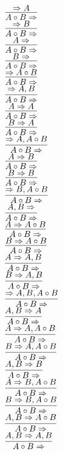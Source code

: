 \documentclass[11pt]{article}
\begin{document}
\begin{center}
\bigskip
\\$\infer{A\circ B\Rightarrow }{\Rightarrow A}$
\bigskip
\\$\infer{A\circ B\Rightarrow }{\Rightarrow B}$
\bigskip
\\$\infer{A\circ B\Rightarrow }{A\Rightarrow }$
\bigskip
\\$\infer{A\circ B\Rightarrow }{B\Rightarrow }$
\bigskip
\\$\infer{A\circ B\Rightarrow }{\Rightarrow A\circ B}$
\bigskip
\\$\infer{A\circ B\Rightarrow }{\Rightarrow A, B}$
\bigskip
\\$\infer{A\circ B\Rightarrow }{A\Rightarrow A}$
\bigskip
\\$\infer{A\circ B\Rightarrow }{B\Rightarrow A}$
\bigskip
\\$\infer{A\circ B\Rightarrow }{\Rightarrow A, A\circ B}$
\bigskip
\\$\infer{A\circ B\Rightarrow }{A\Rightarrow B}$
\bigskip
\\$\infer{A\circ B\Rightarrow }{B\Rightarrow B}$
\bigskip
\\$\infer{A\circ B\Rightarrow }{\Rightarrow B, A\circ B}$
\bigskip
\\$\infer{A\circ B\Rightarrow }{A, B\Rightarrow }$
\bigskip
\\$\infer{A\circ B\Rightarrow }{A\Rightarrow A\circ B}$
\bigskip
\\$\infer{A\circ B\Rightarrow }{B\Rightarrow A\circ B}$
\bigskip
\\$\infer{A\circ B\Rightarrow }{A\Rightarrow A, B}$
\bigskip
\\$\infer{A\circ B\Rightarrow }{B\Rightarrow A, B}$
\bigskip
\\$\infer{A\circ B\Rightarrow }{\Rightarrow A, B, A\circ B}$
\bigskip
\\$\infer{A\circ B\Rightarrow }{A, B\Rightarrow A}$
\bigskip
\\$\infer{A\circ B\Rightarrow }{A\Rightarrow A, A\circ B}$
\bigskip
\\$\infer{A\circ B\Rightarrow }{B\Rightarrow A, A\circ B}$
\bigskip
\\$\infer{A\circ B\Rightarrow }{A, B\Rightarrow B}$
\bigskip
\\$\infer{A\circ B\Rightarrow }{A\Rightarrow B, A\circ B}$
\bigskip
\\$\infer{A\circ B\Rightarrow }{B\Rightarrow B, A\circ B}$
\bigskip
\\$\infer{A\circ B\Rightarrow }{A, B\Rightarrow A\circ B}$
\bigskip
\\$\infer{A\circ B\Rightarrow }{A, B\Rightarrow A, B}$

\end{center}
\end{document}
